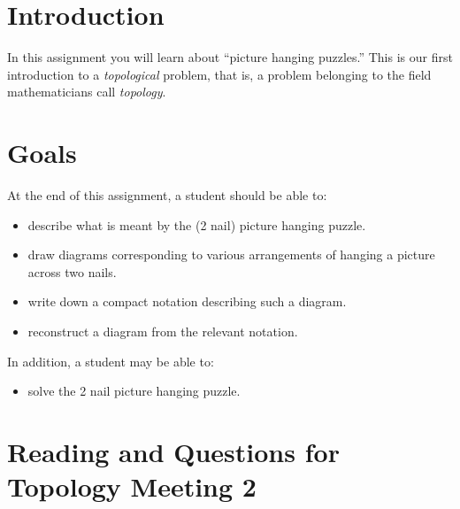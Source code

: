 \documentclass[12pt,letterpaper]{article}
\theoremstyle{definition}
\begin{document}
\setlength{\parskip}{1ex plus 0.5ex minus 0.2ex}
\setlength{\parindent}{0pt}

\pagestyle{fancy}
\cfoot{} 

\section*{Introduction}
In this assignment you will learn about ``picture hanging puzzles.''
This is our first introduction to a \emph{topological} problem, that is, a problem belonging to the field mathematicians call \emph{topology}.

\section*{Goals}
At the end of this assignment, a student should be able to:
\begin{itemize}
\item describe what is meant by the (2 nail) picture hanging puzzle.
\item draw diagrams corresponding to various arrangements of hanging a picture across two nails.
\item write down a compact notation describing such a diagram.
\item reconstruct a diagram from the relevant notation.
\end{itemize}
In addition, a student may be able to:
\begin{itemize}
\item solve the 2 nail picture hanging puzzle.
\end{itemize}

\section*{Reading and Questions for Topology Meeting 2}
\end{document}
